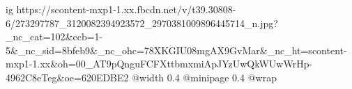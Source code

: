  
 
 
 
 

\ifcmt
  ig https://scontent-mxp1-1.xx.fbcdn.net/v/t39.30808-6/273297787_3120082394923572_2970381009896445714_n.jpg?_nc_cat=102&ccb=1-5&_nc_sid=8bfeb9&_nc_ohc=78XKGIU08mgAX9GvMar&_nc_ht=scontent-mxp1-1.xx&oh=00_AT9pQnguFCFXttbmxmiApJYzUwQkWUwWrHp-4962C8eTeg&oe=620EDBE2
  @width 0.4
  @minipage 0.4
  @wrap \parpic[r]
\fi
